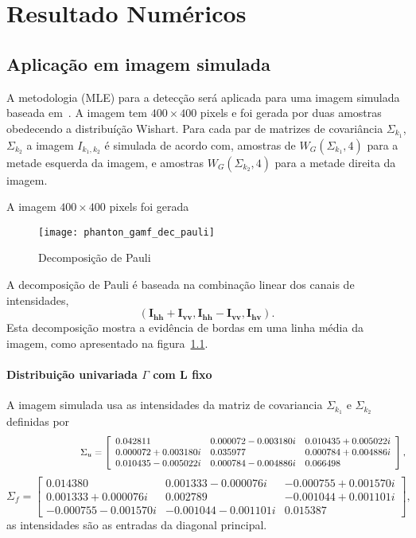 \chapter{Resultado Numéricos}\label{resul_numericos}


\section*{Aplicação em imagem simulada}
A metodologia (MLE) para a detecção será aplicada para uma imagem simulada baseada em~\cite{nhfc,gamf}. A imagem tem $400\times400$ pixels e foi gerada por duas amostras obedecendo a distribuíção Wishart. Para cada par de matrizes de covariância $\Sigma_{k_1}$, $\Sigma_{k_2}$ a imagem $I_{k_1,k_2}$ é simulada de acordo com, amostras de $W_G(\Sigma_{k_1}, 4)$ para a metade esquerda da imagem, e  amostras $W_G(\Sigma_{k_2}, 4)$ para a metade direita da imagem.


A imagem $400 \times 400$ pixels foi gerada
\begin{figure}[hbt]
	\centering
	\texttt{[image: phanton\_gamf\_dec\_pauli]}%
	\caption{Decomposição de Pauli}
\label{fig:simulada_gamf_dec_pauli}
\end{figure}

A decomposição de Pauli é baseada na combinação linear dos canais de intensidades, 
$$(\mathbf{I_\text{hh}+I_{\text{vv}}}, \mathbf{I_\text{hh}-I_{\text{vv}}}, \mathbf{I_\text{hv}}).$$ 
Esta decomposição mostra a evidência de bordas em uma linha média da imagem, como apresentado na figura~\ref{fig:simulada_gamf_dec_pauli}. 
\subsubsection*{Distribuição univariada $\Gamma$ com L fixo}

A imagem simulada  usa as intensidades da matriz de covariancia $\Sigma_{k_1}$ e $\Sigma_{k_2}$ definidas por
\begin{equation}\label{matriz_sigma_gamf_1}
	\hspace{2.75cm} \Sigma_{u}= \left[
\begin{array}{lll}
0.042811            & 0.000072-0.003180i & 0.010435+0.005022i\\
0.000072+0.003180i  & 0.035977           & 0.000784+0.004886i\\
0.010435-0.005022i  & 0.000784-0.004886i & 0.066498
\end{array}
\right],
\end{equation}
\begin{equation}\label{matriz_sigma_gamf_2}
 \Sigma_{f}= \left[
\begin{array}{lll}
0.014380            & 0.001333-0.000076i & -0.000755+0.001570i\\
0.001333+0.000076i  & 0.002789           & -0.001044+0.001101i\\
-0.000755-0.001570i &-0.001044-0.001101i & 0.015387
\end{array}
\right],
\end{equation}
as intensidades são as entradas da diagonal principal.  
    
